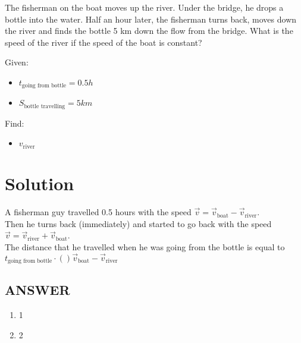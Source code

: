 The fisherman on the boat moves up the river. Under the bridge, he drops a bottle into the water.
Half an hour later, the fisherman turns back, moves down the river and finds the bottle 5 km
down the flow from the bridge. What is the speed of the river if the speed of the boat is constant?

\bigbreak Given: \begin{itemize}
    \item $t_{\text{going from bottle}} = 0.5h$
    \item $S_{\text{bottle travelling}} = 5km$
\end{itemize}

Find: \begin{itemize}
    \item $v_{\text{river}}$
\end{itemize}

\section*{Solution}

A fisherman guy travelled 0.5 hours with the speed $\Vec{v} = \Vec{v}_{\text{boat}} - \Vec{v}_{\text{river}}$.
\\ Then he turns back (immediately) and started to go back with the speed $\Vec{v} = \Vec{v}_{\text{river}} + \Vec{v}_{\text{boat}}$.
\\ The distance that he travelled when he was going from the bottle is equal to $t_{\text{going from bottle}} \cdot ()\Vec{v}_{\text{boat}} - \Vec{v}_{\text{river}}$ 



\vfill
\subsection*{ANSWER}
\begin{enumerate}
    \item 1
    \item 2
\end{enumerate}

